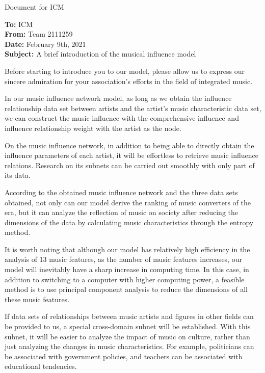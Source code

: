 \documentclass[12pt]{article}  %
\begin{document}
\begin{letter}{Document for ICM}
\begin{flushleft}  %
\textbf{To:} ICM\\
\textbf{From:} Team 2111259\\
\textbf{Date:} February 9th, 2021\\
\textbf{Subject:} A brief introduction of the musical influence model
\end{flushleft}

Before starting to introduce you to our model, please allow us to express our sincere admiration for your association’s efforts in the field of integrated music.\par

In our music influence network model, as long as we obtain the influence relationship data set between artists and the artist's music characteristic data set, we can construct the music influence with the comprehensive influence and influence relationship weight with the artist as the node.\par

On the music influence network, in addition to being able to directly obtain the influence parameters of each artist, it will be effortless to retrieve music influence relations. Research on its subnets can be carried out smoothly with only part of its data. \par

According to the obtained music influence network and the three data sets obtained, not only can our model derive the ranking of music converters of the era, but it can analyze the reflection of music on society after reducing the dimensions of the data by calculating music characteristics through the entropy method.\par

It is worth noting that although our model has relatively high efficiency in the analysis of 13 music features, as the number of music features increases, our model will inevitably have a sharp increase in computing time. In this case, in addition to switching to a computer with higher computing power, a feasible method is to use principal component analysis to reduce the dimensions of all these music features.\par

If data sets of relationships between music artists and figures in other fields can be provided to us, a special cross-domain subnet will be established. With this subnet, it will be easier to analyze the impact of music on culture, rather than just analyzing the changes in music characteristics. For example, politicians can be associated with government policies, and teachers can be associated with educational tendencies.\par


\end{letter}
\end{document}
